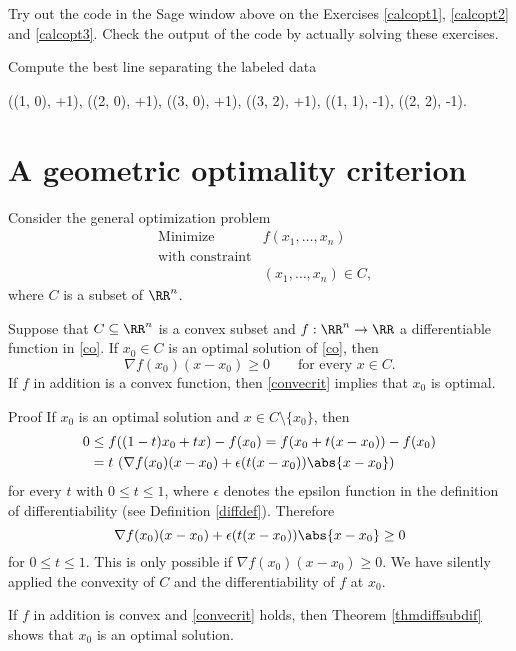 \documentclass{article}
\begin{document}
\beginshex
Try out the code in the Sage window above on the Exercises \ref{calcopt1}, \ref{calcopt2} and
\ref{calcopt3}. Check the output of the code by actually solving these exercises.
\endshex

\beginshex
Compute the best line separating the labeled data
\begin{code}
((1, 0), +1), ((2, 0), +1), ((3, 0), +1), ((3, 2), +1), ((1, 1), -1), ((2, 2), -1).
\end{code}
\endshex






\section{A geometric optimality criterion}

Consider the general optimization problem
  \begin{align}\label{co}
    &\text{Minimize} &f(x_1, \dots, x_n)\\
    &\text{with constraint}\\
    &&(x_1, \dots, x_n)\in C,
  \end{align}
  where $C$ is a subset of $\RR^n$.

  
  \begin{proposition}[emph]\label{simpopt}
  Suppose that $C\subseteq \RR^n$ is a convex subset and $f:\RR^n\rightarrow \RR$ a
  differentiable function in \eqref{co}. If $x_0\in C$ is an optimal solution of \eqref{co},
  then
  \begin{equation}\label{convecrit}
    \nabla f (x_0) (x - x_0) \geq 0\qquad\text{for every } x\in C.
  \end{equation}
  If $f$ in addition is a convex function, then \eqref{convecrit} implies that
  $x_0$ is optimal.
\end{proposition}
\begin{hideinbutton}{Proof}
  If $x_0$ is an optimal solution and $x\in C\setminus\{x_0\}$, then
  \begin{align*}
    0 &\leq f((1-t)x_0 + t x) - f(x_0) = f(x_0 + t(x-x_0)) - f(x_0)\\
    &= t\,\left (\nabla f(x_0)(x-x_0) + \epsilon(t (x-x_0)) \abs{x-x_0 }\right)
  \end{align*}
  for every $t$ with $0\leq t \leq 1$, where $\epsilon$ denotes the
  epsilon function in the definition of differentiability (see
  Definition \ref{diffdef}). Therefore
  \begin{equation*}
    \nabla f(x_0)(x-x_0) + \epsilon(t (x-x_0)) \abs{ x-x_0 }\geq 0
  \end{equation*}
  for $0\leq t\leq 1$. This is only possible if $\nabla
  f(x_0)(x-x_0)\geq 0$.  We have silently applied the convexity of $C$
  and the differentiability of $f$ at $x_0$.

  If $f$ in addition is convex and \eqref{convecrit} holds, then
  Theorem \ref{thmdiffsubdif} shows that $x_0$ is an optimal solution.
\end{hideinbutton}
\end{document}
